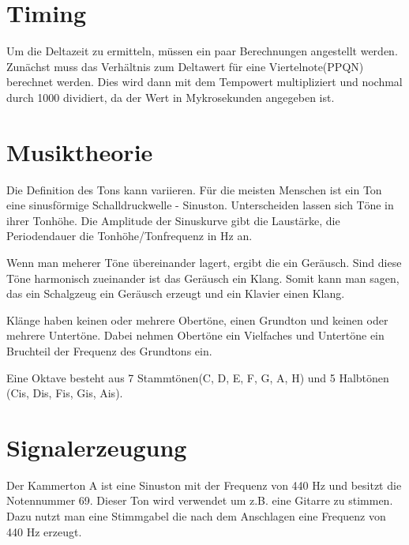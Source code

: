 \documentclass[12pt,a4paper]{report}
\begin{document}
\tableofcontents

\section{Timing}

Um die Deltazeit zu ermitteln, müssen ein paar Berechnungen angestellt werden.
Zunächst muss das Verhältnis zum Deltawert für eine Viertelnote(PPQN) berechnet
werden. Dies wird dann mit dem Tempowert multipliziert und nochmal durch 1000
dividiert, da der Wert in Mykrosekunden angegeben ist.

\section{Musiktheorie}

Die Definition des Tons kann variieren. Für die meisten Menschen ist ein Ton
eine sinusförmige Schalldruckwelle - Sinuston. Unterscheiden lassen sich Töne in
ihrer Tonhöhe. Die Amplitude der Sinuskurve gibt die Laustärke, die
Periodendauer die Tonhöhe/Tonfrequenz in Hz an. 

Wenn man meherer Töne übereinander lagert, ergibt die ein Geräusch. Sind diese
Töne harmonisch zueinander ist das Geräusch ein Klang. Somit kann man sagen, das
ein Schalgzeug ein Geräusch erzeugt und ein Klavier einen Klang. 

Klänge haben keinen oder mehrere Obertöne, einen Grundton und keinen oder
mehrere Untertöne. Dabei nehmen Obertöne ein Vielfaches und Untertöne ein
Bruchteil der Frequenz des Grundtons ein. 

Eine Oktave besteht aus 7 Stammtönen(C, D, E, F, G, A, H) und 5 Halbtönen (Cis,
Dis, Fis, Gis, Ais).
\newpage

\section{Signalerzeugung}

Der Kammerton A ist eine Sinuston mit der Frequenz von 440 Hz und besitzt die
Notennummer 69.
Dieser Ton wird verwendet um z.B. eine Gitarre zu stimmen. Dazu nutzt
man eine Stimmgabel die nach dem Anschlagen eine Frequenz von 440 Hz erzeugt.
\end{document}
